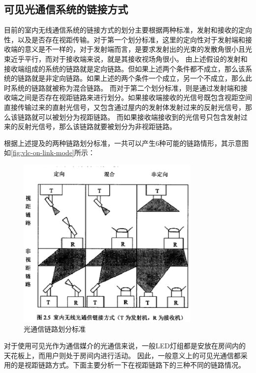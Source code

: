 \subsection{可见光通信系统的链接方式}\label{sec:vlc-on-link-mode}
目前的室内无线通信系统的链接方式的划分主要根据两种标准\cite{WuXia2014}，发射和接收的定向性，以及是否存在视距传输。对于第一个划分标准，这里的定向性对于发射端和接收端的意义是不一样的，对于发射端而言，是要求发射出的光束的发散角很小且光束近乎平行，而对于接收端来说，就是其接收视场角很小。
由上述假设的发射和接收端组成的系统的链路就是定向链路。但如果上述两个条件都不成立，那么该系统的链路就是非定向链路。如果上述的两个条件一个成立，另一个不成立，那么此时系统的链路就被称为混合链路。
而对于第二个划分标准，则是通过发射端和接收端之间是否存在视距链路来进行划分。如果接收端接收的光信号既包含视距空间直接传输过来的直射光信号，又包含通过屋内的发射体发射过来的反射光信号，那么该链路就可以被划分为视距链路。
而如果接收端接收到的光信号只包含发射过来的反射光信号，那么该链路就要被划分为非视距链路。

根据上述提及的两种链路划分标准，一共可以产生6种可能的链路情形，其示意图如\autoref{fig:vlc-on-link-mode}所示\cite{WuXia2014}：

\begin{figure}[htbp]
    \centering
	\includegraphics[width=0.8\textwidth]{figures/chapter-2/VlcOnLinkMode.eps}
	\caption{光通信链路划分标准}
	\label{fig:vlc-on-link-mode}
\end{figure}

对于使用可见光作为通信媒介的光通信来说，一般LED灯组都是安放在房间内的天花板上，而用户则处于房间内进行活动。
因此，一般意义上的可见光通信都采用的是视距链路方式。下面主要分析一下在视距链路下的三种不同的链路情况。

